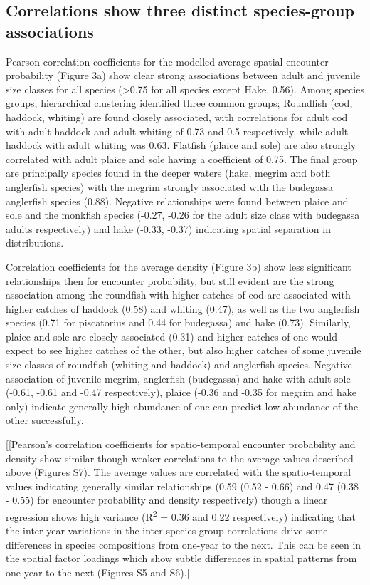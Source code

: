 \documentclass{nature}
\begin{document}
\begin{linenumbers}
[178 words]

\subsection{Correlations show three distinct species-group associations}
Pearson correlation coefficients for the modelled average spatial encounter
probability (Figure 3a) show clear strong associations between adult and
juvenile size classes for all species (\textgreater 0.75 for all species except
Hake, 0.56).  Among species groups, hierarchical clustering identified three
common groups; Roundfish (cod, haddock, whiting) are found closely associated,
with correlations for adult cod with adult haddock and adult whiting of 0.73
and 0.5 respectively, while adult haddock with adult whiting was 0.63. Flatfish
(plaice and sole) are also strongly correlated with adult plaice and sole
having a coefficient of 0.75.  The final group are principally species found in
the deeper waters (hake, megrim and both anglerfish species) with the megrim
strongly associated with the budegassa anglerfish species (0.88). Negative
relationships were found between plaice and sole and the monkfish species
(-0.27, -0.26 for the adult size class with budegassa adults respectively) and
hake (-0.33, -0.37) indicating spatial separation in distributions.

Correlation coefficients for the average density (Figure 3b) show less
significant relationships then for encounter probability, but still evident are
the strong association among the roundfish with higher catches of cod are
associated with higher catches of haddock (0.58) and whiting (0.47), as well as
the two anglerfish species (0.71 for piscatorius and 0.44 for budegassa) and
hake (0.73). Similarly, plaice and sole are closely associated (0.31) and
higher catches of one would expect to see higher catches of the other, but also
higher catches of some juvenile size classes of roundfish (whiting and haddock)
and anglerfish species. Negative association of juvenile megrim, anglerfish
(budegassa) and hake with adult sole (-0.61, -0.61 and -0.47 respectively),
plaice (-0.36 and -0.35 for megrim and hake only) indicate generally high
abundance of one can predict low abundance of the other successfully.

[[Pearson's correlation coefficients for spatio-temporal encounter probability
and density show similar though weaker correlations to the average values
described above (Figures S7).  The average values are correlated with the
spatio-temporal values indicating generally similar relationships (0.59 (0.52 -
0.66) and 0.47 (0.38 - 0.55) for encounter probability and density
respectively) though a linear regression shows high variance
(R\textsuperscript{2} = 0.36 and 0.22 respectively) indicating that the
inter-year variations in the inter-species group correlations drive some
differences in species compositions from one-year to the next.  This can be
seen in the spatial factor loadings which show subtle differences in spatial
patterns from one year to the next (Figures S5 and S6).]]


\end{linenumbers}
\end{document}

